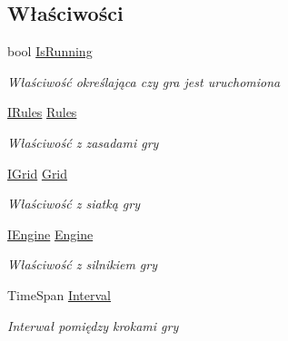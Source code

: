 \subsection*{Właściwości}
\begin{DoxyCompactItemize}
\item 
bool \hyperlink{interface_convay_1_1_core_1_1_interfaces_1_1_i_game_a3757d3d601006324fffb3f50296c0222}{Is\+Running}
\begin{DoxyCompactList}\small\item\em Właściwość określająca czy gra jest uruchomiona \end{DoxyCompactList}\item 
\hyperlink{interface_convay_1_1_core_1_1_interfaces_1_1_i_rules}{I\+Rules} \hyperlink{interface_convay_1_1_core_1_1_interfaces_1_1_i_game_a436757764168b56113bd693f7f15fc72}{Rules}
\begin{DoxyCompactList}\small\item\em Właściwość z zasadami gry \end{DoxyCompactList}\item 
\hyperlink{interface_convay_1_1_core_1_1_interfaces_1_1_i_grid}{I\+Grid} \hyperlink{interface_convay_1_1_core_1_1_interfaces_1_1_i_game_ac5e7536330b91c7af27925ba34deb599}{Grid}
\begin{DoxyCompactList}\small\item\em Właściwość z siatką gry \end{DoxyCompactList}\item 
\hyperlink{interface_convay_1_1_core_1_1_interfaces_1_1_i_engine}{I\+Engine} \hyperlink{interface_convay_1_1_core_1_1_interfaces_1_1_i_game_ac282172d44bb6148137f0d9a5d1f5dbc}{Engine}
\begin{DoxyCompactList}\small\item\em Właściwość z silnikiem gry \end{DoxyCompactList}\item 
Time\+Span \hyperlink{interface_convay_1_1_core_1_1_interfaces_1_1_i_game_ac983ad8ffbfd959d5ba7f37f614c8a5c}{Interval}
\begin{DoxyCompactList}\small\item\em Interwał pomiędzy krokami gry \end{DoxyCompactList}\end{DoxyCompactItemize}
